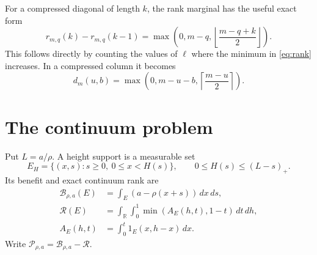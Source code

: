 \documentclass[11pt]{article}
\theoremstyle{remark}\newtheorem{remark}[theorem]{Remark}
\newcommand{\R}{\mathbb R}
\newcommand{\dd}{\,d}
\begin{document}
For a compressed diagonal of length $k$, the rank marginal has the useful exact form
\begin{equation}\label{eq:marginal-discrete}
 r_{m,q}(k)-r_{m,q}(k-1)
 =\max\left(0,m-q,\left\lfloor\frac{m-q+k}{2}\right\rfloor\right).
\end{equation}
This follows directly by counting the values of $\ell$ where the minimum in \eqref{eq:rank} increases. In a compressed column it becomes
\begin{equation}\label{eq:cell-rank}
 d_m(u,b)=\max\left(0,m-u-b,\left\lceil\frac{m-u}{2}\right\rceil\right).
\end{equation}

\section{The continuum problem}

Put $L=a/\rho$. A height support is a measurable set
\[
 E_H=\{(x,s):s\ge0,\ 0\le x<H(s)\},\qquad 0\le H(s)\le(L-s)_+.
\]
Its benefit and exact continuum rank are
\begin{align*}
 \mathcal B_{\rho,a}(E)&=\int_E(a-\rho(x+s))\dd x\dd s,\\
 \mathcal R(E)&=\int_{\R}\int_0^1\min(A_E(h,t),1-t)\dd t\dd h,\\
 A_E(h,t)&=\int_0^t1_E(x,h-x)\dd x.
\end{align*}
Write $\mathcal P_{\rho,a}=\mathcal B_{\rho,a}-\mathcal R$.
\end{document}
